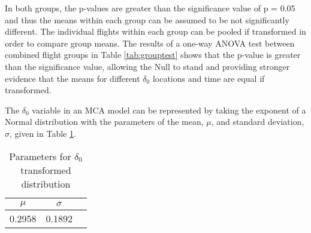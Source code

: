 In both groups, the p-values are greater than the significance value of p = 0.05 and thus the means within each group can be assumed to be not significantly different. The individual flights within each group can be pooled if transformed in order to compare group means. The results of a one-way ANOVA test between combined flight groups in Table \ref{tab:grouptest} shows that the p-value is greater than the significance value, allowing the Null to stand and providing stronger evidence that the means for different $\delta_{0}$ locations and time are equal if transformed.
%
\begin{sidewaystable}  %
\begin{table}[H]
\centering
\caption{Statistics and one-way ANOVA test for transformed groups.}
\label{tab:grouptest}
\end{table}
\end{sidewaystable}  %

The $\delta_{0}$ variable in an MCA model can be represented by taking the exponent of a Normal distribution with the parameters of the mean, $\mu$, and standard deviation, $\sigma$, given in Table \ref{tab:gapnormal}.

\begin{table}[H]
\centering
\caption{Parameters for $\delta_{0}$ transformed distribution}
\label{tab:gapnormal}
\begin{tabular}{@{}ccc@{}}
\toprule
 \textbf{$\mu$} & \textbf{$\sigma$} \\ \midrule
 0.2958 & 0.1892 \\ \bottomrule
\end{tabular}
\end{table}

